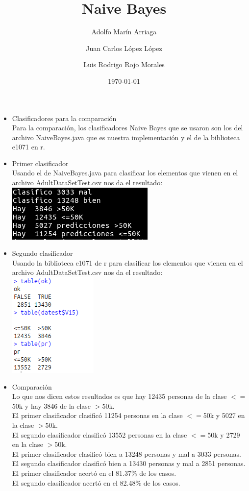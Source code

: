 \documentclass{article}
\title{Naive Bayes}
\author{Adolfo Marín Arriaga \and Juan Carlos López López \and Luis Rodrigo Rojo Morales}
\date{\today\\}
\begin{document}
 \maketitle
 
 \begin{itemize}
  \item Clasificadores para la comparación\\
  Para la comparación, los clasificadores Naive Bayes que se usaron son los del archivo NaiveBayes.java que es nuestra implementación y el de la biblioteca e1071 en r.
  \item Primer clasificador\\
  Usando el de NaiveBayes.java para clasificar los elementos que vienen en el archivo AdultDataSetTest.csv nos da el resultado:\\
  \includegraphics[scale=1]{nbjava}
  \item Segundo clasificador\\
  Usando la biblioteca e1071 de r para clasificar los elementos que vienen en el archivo AdultDataSetTest.csv nos da el resultado:\\
  \includegraphics[scale=1]{nbr}\\
  \item Comparación\\
  Lo que nos dicen estos resultados es que hay 12435 personas de la clase $<=$50k y hay 3846 de la clase $>$50k.\\
  El primer clasificador clasificó 11254 personas en la clase $<=$50k y 5027 en la clase $>$50k.\\
  El segundo clasificador clasificó 13552 personas en la clase $<=$50k y 2729 en la clase $>$50k.\\
  El primer clasificador clasificó bien a 13248 personas y mal a 3033 personas.\\
  El segundo clasificador clasificó bien a 13430 personas y mal a 2851 personas.\\
  El primer clasificador acertó en el 81.37\% de los casos.\\
  El segundo clasificador acertó en el 82.48\% de los casos.\\
 \end{itemize}
 
\end{document}

